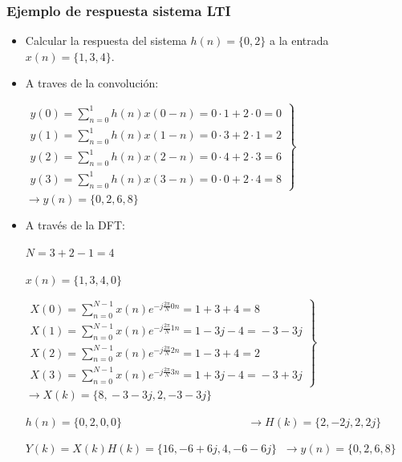 \begin{frame}
\frametitle{Ejemplo de  respuesta sistema LTI}

\footnotesize
\begin{itemize}
\item  \color{olivegreen} Calcular la respuesta del sistema $h(n)=\{0,2\}$ a la entrada  $x(n)=\{1,3,4\}$.
\color{gray}
\item A traves de la convolución:

$\left . \!\!\!\!\! \begin{array}{l} y(0)=\sum_{n=0}^{1}h(n)x(0-n)=0\cdot 1 + 2 \cdot 0=0\\
y(1)=\sum_{n=0}^{1}h(n)x(1-n)=0\cdot 3 + 2 \cdot 1=2\\
y(2)=\sum_{n=0}^{1}h(n)x(2-n)=0\cdot 4+ 2 \cdot 3=6\\
y(3)=\sum_{n=0}^{1}h(n)x(3-n)=0\cdot 0 + 2 \cdot 4=8\end{array}\!\!\right \}$ $\rightarrow y(n)=\{0,2,6,8\}$
\item A través de la DFT:

$N=3+2-1=4$

$x(n)=\{1,3,4,0\}$ 

$\left . \!\!\!\!\! \begin{array}{l} 
X(0)\!=\!\sum_{n=0}^{N-1}\!x(n)e^{-j\frac{2\pi}{N}0n}\!=\!1\!+\!3\!+\!4\!=\!8\\
X(1)\!=\!\sum_{n=0}^{N-1}\!x(n)e^{-j\frac{2\pi}{N}1n}\!=\!1\!-\!3j\!-\!4\!=\!-\!3\!-\!3j\\
X(2)\!=\!\sum_{n=0}^{N-1}\!x(n)e^{-j\frac{2\pi}{N}2n}\!=\!1\!-\!3\!+\!4\!=\!2\\
X(3)\!=\!\sum_{n=0}^{N-1}\!x(n)e^{-j\frac{2\pi}{N}3n}\!=\!1\!+\!3j\!-\!4\!=\!-3\!+\!3j\end{array}\!\!\right \}$ $\rightarrow X(k)\!=\!\{8,\!-3\!-\!3j,2,-3\!-3j\}$



$h(n)=\{0,2,0,0\}\:\:\:\:\:\:\:\:\:\:\:\:\:\:\:\:\:\:\:\:\:\:\:\:\:\:\:\:\:\:\:\:\:\:\:\:\:\:\:\:\:\:\:\:\:\:\:\:\:$ $\rightarrow H(k)=\{2,-2j,2,2j\}$

$Y(k)\!=\!X(k)H(k)\!=\!\{16,-6\!+\!6j,4,-6\!-\!6j\}$ $\:\rightarrow y(n)=\{0,2,6,8\}$


\end{itemize}

\end{frame}
